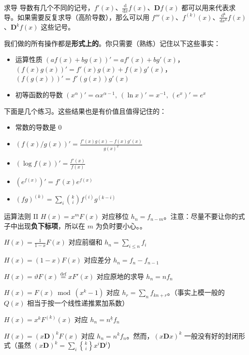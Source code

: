 \begin{frame}{求导}
    导数有几个不同的记号，$f'(x)$、$\frac{\mathrm{d}}{\mathrm{d}x} f(x)$、$\mathbf D f(x)$ 都可以用来代表求导。如果需要反复求导（高阶导数），那么可以用 $f'''(x)$、$f^{(k)}(x)$、$\frac{\mathrm{d^k}}{\mathrm{d}x^k} f(x)$、$\mathbf D^k f(x)$ 这些记号。

    我们做的所有操作都是\textbf{形式上的}。你只需要（熟练）记住以下这些事实：
    \begin{itemize}
        \item 运算性质 $(af(x)+bg(x))'=af'(x)+bg'(x)$，$(f(x)g(x))'=f'(x)g(x)+f(x)g'(x)$，$(f(g(x)))'=f'(g(x))g'(x)$
        \item 初等函数的导数 $(x^{\alpha})'=\alpha x^{\alpha-1},\ (\ln x)'=x^{-1},\ (e^x)'=e^x$
    \end{itemize}
    下面是几个练习。这些结果也是有价值且值得记住的：
    \begin{itemize}
        \item 常数的导数是 $0$
        \item $(f(x)/g(x))'=\frac{f'(x)g(x)-f(x)g'(x)}{g(x)^2}$
        \item $(\log f(x))'=\frac{f'(x)}{f(x)}$
        \item $(e^{f(x)})'=f'(x)e^{f(x)}$
        \item $(fg)^{(k)}=\sum_i \binom{k}{i}f^{(i)}g^{(k-i)}$
    \end{itemize}
\end{frame}
\begin{frame}{运算法则 II}
    $H(x)=x^mF(x)$ 对应移位 $h_n=f_{n-m}$。注意：尽量不要让你的式子中出现\textbf{负下标项}，所以在 $m$ 为负时要小心。。

    $H(x)=\frac{1}{1-x}F(x)$ 对应前缀和 $h_n=\sum_{i\le n}f_i$

    $H(x)=(1-x)F(x)$ 对应差分 $h_n=f_n-f_{n-1}$

    $H(x)=\vartheta F(x)\overset{\mathrm{def}}{=}xF'(x)$ 对应原地的求导 $h_n=nf_n$

    $H(x)=F(x)\bmod (x^k-1)$ 对应 $h_r=\sum_n f_{kn+r}$。（事实上模一般的 $Q(x)$ 相当于按一个线性递推累加系数）

    $H(x)=x^kF^{(k)}(x)$ 对应 $h_n=n^{\underline{k}}f_n$

    $H(x)=(x\mathbf D)^kF(x)$ 对应 $h_n=n^k f_n$。然而，$(x\mathbf D x)^k$ 一般没有好的封闭形式（虽然 $(x\mathbf D)^k=\sum_i {k\brace i}x^i\mathbf D^i$）
\end{frame}
